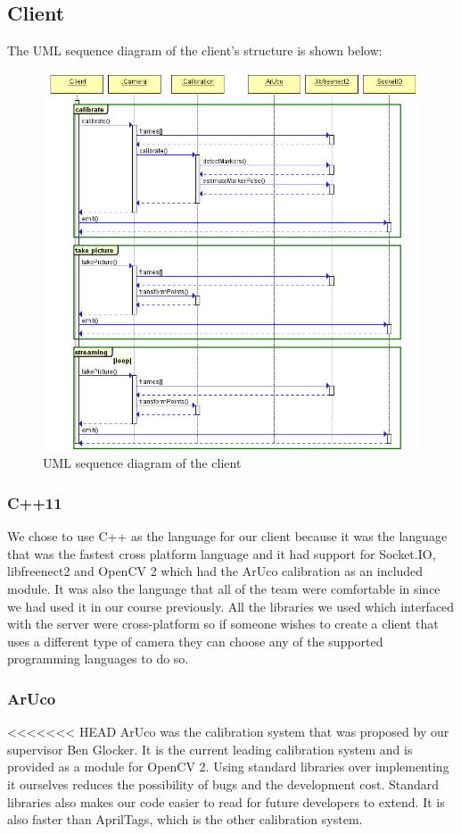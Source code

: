 \documentclass{article}
\begin{document}
\subsection{Client}
The UML sequence diagram of the client's structure is shown below:
\begin{figure}[h]
  \centering
  \includegraphics[scale=0.6]{clientUML}
  \caption{UML sequence diagram of the client}
\end{figure}
\subsubsection{C++11}
We chose to use C++ as the language for our client because it was the language that was the fastest cross platform language and it had support for Socket.IO, libfreenect2 and OpenCV 2 which had the ArUco calibration as an included module. It was also the language that all of the team were comfortable in since we had used it in our course previously. All the libraries we used which interfaced with the server were cross-platform so if someone wishes to create a client that uses a different type of camera they can choose any of the supported programming languages to do so.
\subsubsection{ArUco}
<<<<<<< HEAD
ArUco was the calibration system that was proposed by our supervisor Ben Glocker. It is the current leading calibration system and is provided as a module for OpenCV 2. Using standard libraries over implementing it ourselves reduces the possibility of bugs and the development cost. Standard libraries also makes our code easier to read for future developers to extend. It is also faster than AprilTags, which is the other calibration system.
\end{document}
